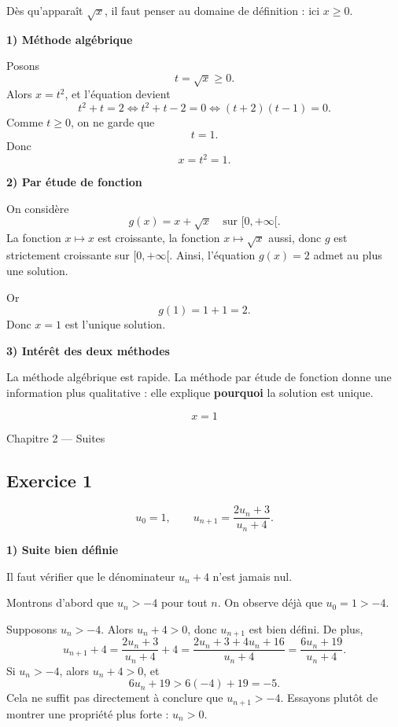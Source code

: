 \documentclass[11pt,a4paper]{article}
\begin{document}
\begin{methodebox}
Dès qu'apparaît \(\sqrt{x}\), il faut penser au domaine de définition : ici \(x\geq 0\).
\end{methodebox}

\textbf{1) Méthode algébrique}

Posons
\[
t=\sqrt{x}\geq 0.
\]
Alors \(x=t^2\), et l'équation devient
\[
t^2+t=2
\iff t^2+t-2=0
\iff (t+2)(t-1)=0.
\]
Comme \(t\geq 0\), on ne garde que
\[
t=1.
\]
Donc
\[
x=t^2=1.
\]

\textbf{2) Par étude de fonction}

On considère
\[
g(x)=x+\sqrt{x}
\quad \text{sur } [0,+\infty[.
\]
La fonction \(x\mapsto x\) est croissante, la fonction \(x\mapsto \sqrt{x}\) aussi, donc \(g\) est strictement croissante sur \([0,+\infty[\).  
Ainsi, l'équation \(g(x)=2\) admet au plus une solution.

Or
\[
g(1)=1+1=2.
\]
Donc \(x=1\) est l'unique solution.

\textbf{3) Intérêt des deux méthodes}

La méthode algébrique est rapide.  
La méthode par étude de fonction donne une information plus qualitative : elle explique \textbf{pourquoi} la solution est unique.

\[
\boxed{x=1}
\]

\begin{chapitrebox}{Chapitre 2 --- Suites}
\end{chapitrebox}

\subsection*{Exercice 1}
\[
u_0=1,\qquad u_{n+1}=\frac{2u_n+3}{u_n+4}.
\]

\textbf{1) Suite bien définie}

Il faut vérifier que le dénominateur \(u_n+4\) n'est jamais nul.

Montrons d'abord que \(u_n>-4\) pour tout \(n\).  
On observe déjà que \(u_0=1>-4\).

Supposons \(u_n>-4\). Alors \(u_n+4>0\), donc \(u_{n+1}\) est bien défini.  
De plus,
\[
u_{n+1}+4=\frac{2u_n+3}{u_n+4}+4
=\frac{2u_n+3+4u_n+16}{u_n+4}
=\frac{6u_n+19}{u_n+4}.
\]
Si \(u_n>-4\), alors \(u_n+4>0\), et
\[
6u_n+19>6(-4)+19=-5.
\]
Cela ne suffit pas directement à conclure que \(u_{n+1}>-4\).  
Essayons plutôt de montrer une propriété plus forte : \(u_n>0\).
\end{document}
